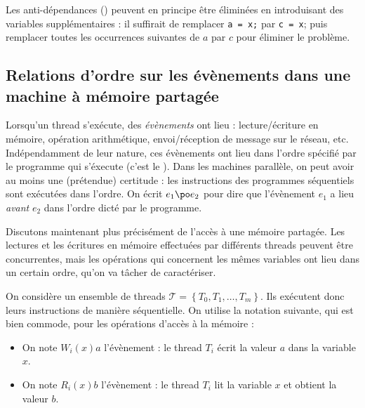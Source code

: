 Les anti-dépendances (\og {}\fg{}) peuvent en
principe être éliminées en introduisant des variables supplémentaires
: il suffirait de remplacer \texttt{a = x;} par
\texttt{c = x}; puis remplacer toutes les occurrences suivantes
de $a$ par $c$ pour éliminer le problème.

\subsection{Relations d'ordre sur les évènements dans une machine à mémoire
  partagée}

Lorsqu'un thread s'exécute, des \emph{évènements} ont lieu : lecture/écriture en
mémoire, opération arithmétique, envoi/réception de message sur le réseau, etc.
Indépendamment de leur nature, ces évènements ont lieu dans l'ordre spécifié par
le programme qui s'éxecute (c'est le \og {}\fg). Dans les
machines parallèle, on peut avoir au moins une (prétendue) certitude : les
instructions des programmes séquentiels sont exécutées dans l'ordre. On écrit
$e_1 \po e_2$ pour dire que l'évènement $e_1$ a lieu \emph{avant} $e_2$ dans
l'ordre dicté par le programme.


Discutons maintenant plus précisément de l'accès à une mémoire partagée. Les
lectures et les écritures en mémoire effectuées par différents threads peuvent
être concurrentes, mais les opérations qui concernent les mêmes variables ont
lieu dans un certain ordre, qu'on va tâcher de caractériser.

On considère un ensemble de threads
$\mathcal{T} = \left\{ T_0, T_1, \dots, T_m \right\}$. Ils exécutent donc leurs
instructions de manière séquentielle. On utilise la notation suivante, qui est
bien commode, pour les opérations d'accès à la mémoire :
\begin{itemize}
\item On note $W_i(x)a$ l'évènement : \og le thread $T_i$ écrit la valeur $a$ dans la variable
  $x$\fg.
\item On note $R_i(x)b$ l'évènement : \og le thread $T_i$ lit la variable
  $x$ et obtient la valeur $b$\fg.
\end{itemize}


